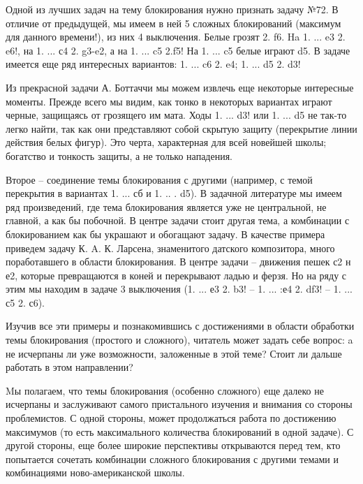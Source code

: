 Одной из лучших задач на тему блокирования нужно признать задачу №72. В отличие от предыдущей, мы имеем в ней 5 сложных блокирований (максимум для данного времени!), из них 4 выключения. Белые грозят 2. \queen{}f6\mate{}. Ha 1. ... \rook{}e3 2. \knight{}e6\mate{}!, на 1. ... \knight{}с4 2. \knight{}g3-e2\mate{}, а на 1. ... c5 2.\knight{}f5\mate{}! На 1. ... \rook{}c5 белые играют \knight{}d5\mate{}. В задаче имеется еще ряд интересных вариантов: 1. ... c6 2. \rook{}e4\mate{}; 1. ... d5 2. \knight{}d3\mate{}!
	
Из прекрасной задачи А. Боттаччи мы можем извлечь еще некоторые интересные моменты. Прежде всего мы видим, как тонко в некоторых вариантах играют черные, защищаясь от грозящего им мата. Ходы 1. ... \rook{}d3! или 1. ... d5 не так-то легко найти, так как они представляют собой скрытую защиту (перекрытие линии действия белых фигур). Это черта, характерная для всей новейшей школы; богатство и тонкость защиты, а не только нападения.

Второе -- соединение темы блокирования с другими (например, с темой перекрытия в вариантах 1. ... сб и 1. .. . d5). В задачной литературе мы имеем ряд произведений, где тема блокирования является уже не центральной, не главной, а как бы побочной. В центре задачи стоит другая тема, а комбинации с блокированием как бы украшают и обогащают задачу. В качестве примера приведем задачу К. A. К. Ларсена, знаменитого датского композитора, много поработавшего в области блокирования. В центре задачи -- движения пешек с2 н е2, которые превращаются в коней и перекрывают ладью и ферзя. Но на ряду с этим мы находим в задаче 3 выключения (1. ... \queen{}е3 2. \knight{}b3\mate{}! -- 1. ... \bishop{}:е4 2. \knight{}df3\mate{}! -- 1. ... \knight{}с5 2. \knight{}с6\mate{}).

Изучив все эти примеры и познакомившись с достижениями в области обработки темы блокирования (простого и сложного), читатель может задать себе вопрос: a не исчерпаны ли уже возможности, заложенные в этой теме? Стоит ли дальше работать в этом направлении?

Mы полагаем, что темы блокирования (особенно сложного) еще далеко не исчерпаны и заслуживают самого пристального изучения и внимания со стороны проблемистов. С одной стороны, может продолжаться работа по достижению максимумов (то есть максимального количества блокирований в одной задаче). С другой стороны, еще более широкие перспективы открываются перед тем, кто попытается сочетать комбинации сложного блокирования с другими темами и комбинациями ново-американской школы.
